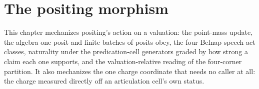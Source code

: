 \chapter{The positing morphism}\label{ch:positing-morphism}

This chapter mechanizes positing's action on a valuation: the point-mass
update, the algebra one posit and finite batches of posits obey, the four
Belnap speech-act classes, naturality under the predication-cell generators
graded by how strong a claim each one supports, and the valuation-relative
reading of the four-corner partition. It also mechanizes the one charge
coordinate that needs no caller at all: the charge measured directly off an
articulation cell's own status.







